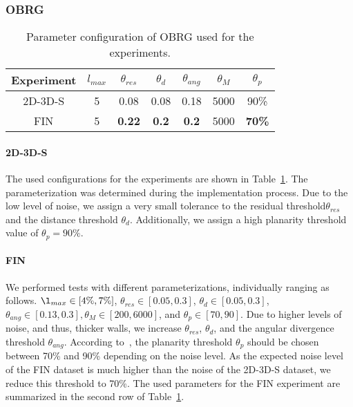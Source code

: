 \documentclass[main.tex]{subfiles}
\begin{document}
\subsubsection{OBRG}
\begin{table}[H]
    \centering
    \begin{tabular}{c|cccccc}
        Experiment & $l_{max}$ & $\theta_{res}$ & $\theta_{d}$ & $\theta_{ang}$ & $\theta_M$ & $\theta_p$    \\ \hline
        2D-3D-S    & 5         & 0.08           & 0.08         & 0.18           & 5000       & 90\%          \\
        FIN        & 5         & \textbf{0.22}  & \textbf{0.2} & \textbf{0.2}   & 5000       & \textbf{70\%}
    \end{tabular}
    \caption{Parameter configuration of OBRG used for the experiments.}
    \label{tab:obrg-param}
\end{table}


\paragraph{2D-3D-S}
The used configurations for the experiments are shown in Table~\ref{tab:obrg-param}.
The parameterization was determined during the implementation process.
Due to the low level of noise, we assign a very small tolerance to the residual threshold$\theta_{res}$ and the distance threshold $\theta_d$. 
Additionally, we assign a high planarity threshold value of $\theta_p = 90\%$.

\paragraph{FIN}
We performed tests with different parameterizations, individually ranging as follows.
$\l_{max} \in [4\%, 7\%]$, $\theta_{res} \in [0.05, 0.3]$, $\theta_d \in [0.05, 0.3]$, $\theta_{ang}\in[0.13, 0.3], \theta_M \in [200, 6000]$,
and $\theta_p\in[70, 90]$.
Due to higher levels of noise, and thus, thicker walls, we increase $\theta_{res}$, $\theta_d$, and the angular divergence threshold $\theta_{ang}$. According to~\cite[Section~3.4]{Vo_Truong-Hong_Laefer_Bertolotto_2015},
the planarity threshold $\theta_p$ should be chosen between 70\% and 90\% depending on the noise level. As the expected noise level of the
FIN dataset is much higher than the noise of the 2D-3D-S dataset, we reduce this threshold to 70\%.
The used parameters for the FIN experiment are summarized in the second row of Table~\ref{tab:obrg-param}.
\end{document}
